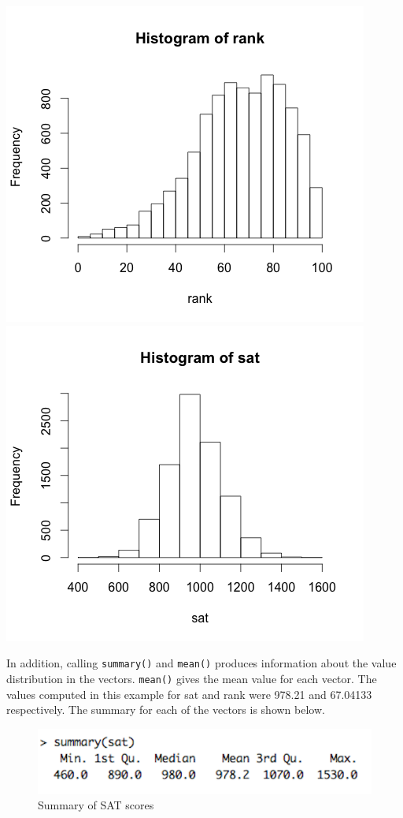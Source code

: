 \documentclass{article}
\begin{document}
\begin{center}
\includegraphics[scale=0.5]{Rplot01}
\includegraphics[scale=0.5]{Rplot}
\end{center}

In addition, calling \verb|summary()| and \verb|mean()| produces 
information about the value distribution in the vectors. 
\verb|mean()| gives the mean value for each vector. 
The values computed in this example for sat and rank were 978.21 and 67.04133 respectively.
The summary for each of the vectors is shown below.
 
\begin{figure}[H]
\begin{center}
\includegraphics[scale=0.4]{satsum}
\end{center}
\caption{Summary of SAT scores}
\end{figure}
\end{document}
